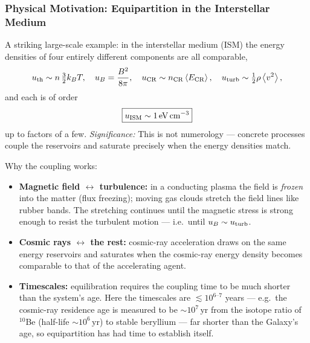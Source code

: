 \subsubsection*{Physical Motivation: Equipartition in the Interstellar Medium}
A striking large-scale example: in the interstellar medium (ISM) the energy
densities of four entirely different components are all comparable,
\begin{equation}
    u_{\rm th}\sim n\,\tfrac32 k_BT,
    \quad
    u_{B}=\frac{B^2}{8\pi},
    \quad
    u_{\rm CR}\sim n_{\rm CR}\expval{E_{\rm CR}},
    \quad
    u_{\rm turb}\sim\tfrac12\rho\expval{v^2},
    \label{eq:lec09:ism-components}
\end{equation}
and each is of order
\begin{equation}
    \boxed{
    u_{\rm ISM}\sim1\,\si{eV.cm^{-3}}
    }
    \label{eq:lec09:ism-energy-density}
\end{equation}
up to factors of a few.
\textit{Significance:} This is not numerology --- concrete processes couple
the reservoirs and saturate precisely when the energy densities match.

Why the coupling works:
\begin{itemize}
    \item \textbf{Magnetic field $\leftrightarrow$ turbulence:} in a
    conducting plasma the field is \emph{frozen} into the matter (flux
    freezing); moving gas clouds stretch the field lines like rubber bands.
    The stretching continues until the magnetic stress is strong enough to
    resist the turbulent motion --- i.e.\ until $u_B\sim u_{\rm turb}$.
    \item \textbf{Cosmic rays $\leftrightarrow$ the rest:} cosmic-ray
    acceleration draws on the same energy reservoirs and saturates when the
    cosmic-ray energy density becomes comparable to that of the accelerating
    agent.
    \item \textbf{Timescales:} equilibration requires the coupling time to be
    much shorter than the system's age. Here the timescales are
    $\lesssim10^{6\text{--}7}$ years --- e.g.\ the cosmic-ray residence age is
    measured to be $\sim10^{7}\,\mathrm{yr}$ from the isotope ratio of
    $^{10}$Be (half-life $\sim10^{6}\,\mathrm{yr}$) to stable beryllium ---
    far shorter than the Galaxy's age, so equipartition has had time to
    establish itself.
\end{itemize}

